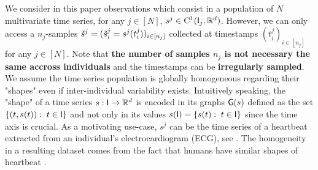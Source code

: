 We consider in this paper observations which consist in a population of $N$ multivariate time series, for any $j\in[N]$, $s^j \in \mathrm{C}^1(\mathsf{I}_j,\mathbb{R}^{d})$. 
However, we can only access a $n_j$-samples $\tilde{s}^j=(\tilde{s}_i^j=s^j(t^j_i))_{i\in[n_j]}$ collected at timestamps $(t^j_i)_{i\in[n_j]}$ for any $j \in [N]$.
 Note that \textbf{the number of samples $n_j$ is not necessary the same accross individuals} and the timestamps can be \textbf{irregularly sampled}.
 We assume the time series population is globally homogeneous regarding their "shapes" even if inter-individual variability exists.
 Intuitively speaking, the "shape" of a time series $s:\mathsf{I}\to \mathbb{R}^d$ is encoded in its graphs $\mathsf{G}(s)$ defined as the set $\{(t,s(t)):\; t\in\mathsf{I} \} $ and not only in its values $s(\mathsf{I})=\{s(t):\; t\in\mathsf{I} \} $ since the time axis is crucial. %
 As a motivating use-case, $s^j$ can be the time series of a heartbeat extracted from an individual's electrocardiogram (ECG), see .
 The homogeneity in a resulting dataset comes from the fact that humans have similar shapes of heartbeat \cite{ye2012heartbeat,madona2021pqrst}.
